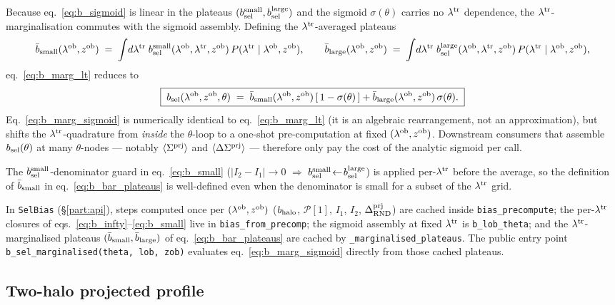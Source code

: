 \documentclass[a4paper, 11pt]{article}
\newcommand{\lob}{\lambda^{\rm ob}}
\newcommand{\ltr}{\lambda^{\rm tr}}
\newcommand{\zob}{z^{\rm ob}}
\newcommand{\dprj}{\Delta^{\rm prj}}
\newcommand{\Pop}{\mathcal{P}}
\newcommand{\bsel}{b_{\rm sel}}
\newcommand{\bhalo}{b_{\rm halo}}
\newcommand{\bsmall}{b_{\rm sel}^{\rm small}}
\newcommand{\blarge}{b_{\rm sel}^{\rm large}}
\newcommand{\Sprj}{\Sigma^{\rm prj}}
\newcommand{\DSprj}{\Delta\Sigma^{\rm prj}}
\newcommand{\avg}[1]{\langle #1 \rangle}
\begin{document}
Because eq.~\eqref{eq:b_sigmoid} is linear in the plateaus
\((\bsmall,\blarge)\) and the sigmoid \(\sigma(\theta)\) carries no
\(\ltr\) dependence, the \(\ltr\)-marginalisation commutes with the
sigmoid assembly. Defining the \(\ltr\)-averaged plateaus
\begin{equation}
\bar{b}_{\rm small}(\lob,\zob)
\;=\; \int\!d\ltr\;\bsmall(\lob,\ltr,\zob)\,P(\ltr\mid\lob,\zob),
\qquad
\bar{b}_{\rm large}(\lob,\zob)
\;=\; \int\!d\ltr\;\blarge(\lob,\ltr,\zob)\,P(\ltr\mid\lob,\zob),
\label{eq:b_bar_plateaus}
\end{equation}
eq.~\eqref{eq:b_marg_lt} reduces to
\begin{equation}
\boxed{\;
\bsel(\lob,\zob,\theta)
\;=\; \bar{b}_{\rm small}(\lob,\zob)\,[\,1-\sigma(\theta)\,]
   + \bar{b}_{\rm large}(\lob,\zob)\,\sigma(\theta).
\;}
\label{eq:b_marg_sigmoid}
\end{equation}
Eq.~\eqref{eq:b_marg_sigmoid} is numerically identical to
eq.~\eqref{eq:b_marg_lt} (it is an algebraic rearrangement, not an
approximation), but shifts the \(\ltr\)-quadrature from \emph{inside}
the \(\theta\)-loop to a one-shot pre-computation at fixed
\((\lob,\zob)\). Downstream consumers that assemble \(\bsel(\theta)\)
at many \(\theta\)-nodes --- notably
\(\avg{\Sprj}\) and \(\avg{\DSprj}\) --- therefore only pay the cost
of the analytic sigmoid per call.

The \(\bsmall\)-denominator guard in eq.~\eqref{eq:b_small}
(\(|I_2-I_1|\to 0\) \(\Rightarrow\) \(\bsmall\!\leftarrow\!\blarge\))
is applied per-\(\ltr\) before the average, so the definition of
\(\bar{b}_{\rm small}\) in eq.~\eqref{eq:b_bar_plateaus} is
well-defined even when the denominator is small for a subset of the
\(\ltr\) grid.

In \texttt{SelBias} (\S\ref{part:api}), steps computed once per
\((\lob,\zob)\) (\(\bhalo\), \(\Pop[1]\), \(I_1\), \(I_2\),
\(\dprj_{\rm RND}\)) are cached inside
\texttt{bias\_precompute}; the per-\(\ltr\) closures of
eqs.~\eqref{eq:b_infty}--\eqref{eq:b_small} live in
\texttt{bias\_from\_precomp}; the sigmoid assembly at fixed
\(\ltr\) is \texttt{b\_lob\_theta}; and the
\(\ltr\)-marginalised plateaus
\((\bar{b}_{\rm small},\bar{b}_{\rm large})\) of
eq.~\eqref{eq:b_bar_plateaus} are cached by
\texttt{\_marginalised\_plateaus}. The public entry point
\texttt{b\_sel\_marginalised(theta, lob, zob)} evaluates
eq.~\eqref{eq:b_marg_sigmoid} directly from those cached plateaus.

\subsection{Two-halo projected profile}
\label{sec:Sprj}
\end{document}
